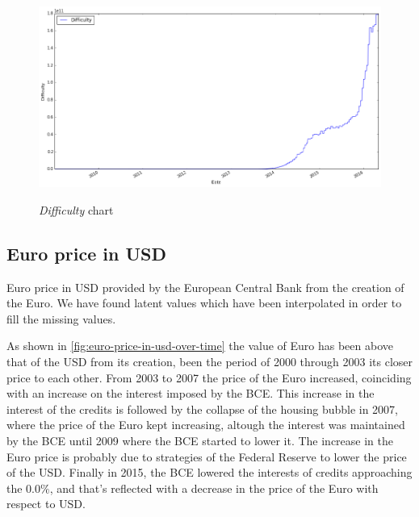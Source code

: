 \begin{figure}[bth]
  \myfloatalign
  {\includegraphics[width=1\linewidth]
    {gfx/difficulty-over-time}}
  \caption{\textit{Difficulty} chart}
  \label{fig:difficulty-over-time}
\end{figure}


\subsection{Euro price in USD}
\label{sec:euro-price-in-usd}


Euro price in USD provided by the European Central Bank from the
creation of the Euro. We have found latent values which have been
interpolated in order to fill the missing values.

As shown in \autoref{fig:euro-price-in-usd-over-time} the value of Euro
has been above that of the USD from its creation, been the period of
2000 through 2003 its closer price to each other. From 2003 to 2007
the price of the Euro increased, coinciding with an increase on the
interest imposed by the BCE. This increase in the interest of the
credits is followed by the collapse of the housing bubble in 2007,
where the price of the Euro kept increasing, altough the interest was
maintained by the BCE until 2009 where the BCE started to lower it.
The increase in the Euro price is probably due to strategies of the
Federal Reserve to lower the price of the USD. Finally in 2015, the
BCE lowered the interests of credits approaching the $0.0\%$, and
that's reflected with a decrease in the price of the Euro with respect
to USD.

